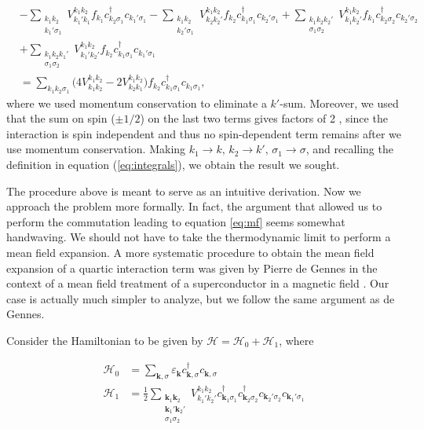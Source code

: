 \begin{equation}
\begin{split}
&- \sum_{\substack{k_1 k_2 \\ k_1' \sigma_1}} V_{k_1' k_1}^{k_1 k_2} f_{k_1} c_{k_2 \sigma_1}^\dagger c_{k_1' \sigma_1}  - \sum_{\substack{k_1 k_2 \\ k_2' \sigma_1}} V_{k_2 k_2'}^{k_1 k_2} f_{k_2} c_{k_1 \sigma_1}^\dagger c_{k_2' \sigma_1} + \sum_{\substack{k_1 k_2 k_2' \\ \sigma_1 \sigma_2}} V_{k_1 k_2'}^{k_1 k_2} f_{k_1} c_{k_2 \sigma_2}^\dagger c_{k_2' \sigma_2} \\
& + \sum_{\substack{k_1 k_2 k_1' \\  \sigma_1 \sigma_2}} V_{k_1' k_2'}^{k_1 k_2} f_{k_2} c_{k_1 \sigma_1}^\dagger c_{k_1' \sigma_1} \\
&= \sum_{k_1 k_2 \sigma_1} \bigg( 4 V_{k_1 k_2}^{k_1 k_2} - 2  V_{k_2 k_1}^{k_1 k_2}  \bigg) f_{k_2} c_{k_1 \sigma_1}^\dagger c_{k_1 \sigma_1}
,
\end{split}
\end{equation}
where we used momentum conservation to eliminate a $k'$-sum. Moreover, we used that the sum on spin ($\pm 1/2$) on the last two terms gives factors of 2 , since the interaction is spin independent and thus no spin-dependent term remains after we use momentum conservation. Making $k_1 \rightarrow k , \, k_2 \rightarrow k', \, \sigma_1 \rightarrow \sigma$, and recalling the definition in equation (\ref{eq:integrals}), we obtain the result we sought.

The procedure above is meant to serve as an intuitive derivation. Now we approach the problem more formally. In fact, the argument that allowed us to perform the commutation leading to equation \ref{eq:mf} seems somewhat handwaving. We should not have to take the thermodynamic limit to perform a mean field expansion. A more systematic procedure to obtain the mean field expansion of a quartic interaction term was given by Pierre de Gennes in the context of a mean field treatment of a superconductor in a magnetic field \cite{gennes_superconductivity_1999}. Our case is actually much simpler to analyze, but we follow the same argument as de Gennes.

Consider the Hamiltonian to be given by $\mathcal{H} = \mathcal{H}_0 + \mathcal{H}_1$, where

\begin{equation}
\begin{split}
\mathcal{H}_0 &= \sum_{\bm k, \sigma} \varepsilon_{\bm k} c_{\bm k, \sigma}^\dagger c_{\bm k, \sigma} \\
\mathcal{H}_1 &= \frac{1}{2} \sum_{\substack{\bm k_1 \bm k_2 \\ \bm k_1' \bm k_2' \\  \sigma_1 \sigma_2}} V_{k_1' k_2'}^{k_1 k_2} c_{\bm k_1 \sigma_1}^\dagger c_{\bm k_2 \sigma_2}^\dagger c_{\bm k_2' \sigma_2} c_{\bm k_1' \sigma_1} 
\end{split}
\end{equation}

